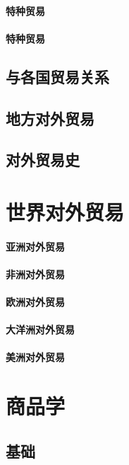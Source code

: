 \documentclass[UTF8]{../../RepresentationUniverse}
\begin{document}
    \subsubsection{特种贸易}
    \subsubsection{特种贸易}
\section{与各国贸易关系}
\section{地方对外贸易}
\section{对外贸易史}

\chapter{世界对外贸易}
    \subsubsection{亚洲对外贸易}
    \subsubsection{非洲对外贸易}
    \subsubsection{欧洲对外贸易}
    \subsubsection{大洋洲对外贸易}
    \subsubsection{美洲对外贸易}





\chapter{商品学}

\section{基础}
\end{document}
